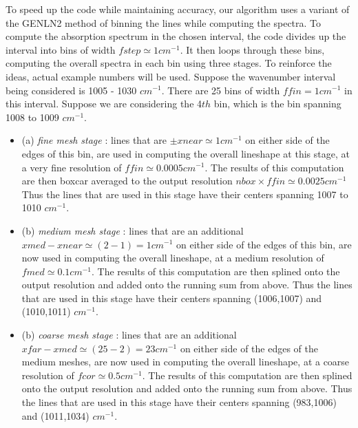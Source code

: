 \documentclass[11pt]{article}
\begin{document}
To speed up the code while maintaining accuracy, our algorithm uses a variant 
of the GENLN2 method of binning the lines while computing the spectra. To 
compute the absorption 
spectrum in the chosen interval, the code divides up the interval into 
bins of width $fstep \simeq 1 cm^{-1}$.  It then loops through these bins, 
computing the overall spectra in each bin using three stages. To reinforce
the ideas, actual example numbers will be used. Suppose the wavenumber
interval being considered is 1005 - 1030 $cm^{-1}$. There are 25 bins of
width $ffin = 1 cm^{-1}$ in this interval. Suppose we are considering the
4$th$ bin, which is the bin spanning 1008 to 1009 $cm^{-1}$.
\begin{itemize}
\item (a) {\it fine mesh stage} : lines that are $\pm xnear \simeq 1cm^{-1}$
          on either side of the edges of this bin, are used in computing 
          the overall lineshape at this stage, at a very fine resolution of 
          $ffin \simeq 0.0005 cm^{-1}$. The results of this computation 
          are then boxcar averaged to the output resolution $nbox \times 
          ffin \simeq 0.0025 cm^{-1}$ \\
          Thus the lines that are used in this stage have their centers 
          spanning 1007 to 1010 $cm^{-1}$.

\item (b) {\it medium mesh stage} : lines that are an additional 
          $xmed - xnear \simeq (2 - 1) = 1 cm^{-1}$ on either side of the 
          edges of this bin, are now used in computing 
          the overall lineshape, at a medium resolution of 
          $fmed \simeq 0.1 cm^{-1}$. The results of this computation 
          are then splined onto the output resolution and added onto the
          running sum from above.
          Thus the lines that are used in this stage have their centers 
          spanning (1006,1007) and (1010,1011) $cm^{-1}$.

\item (b) {\it coarse mesh stage} : lines that are an additional 
          $xfar - xmed \simeq (25 - 2) = 23 cm^{-1}$ on either side of the 
          edges of the medium meshes, are now used in computing 
          the overall lineshape, at a coarse resolution of 
          $fcor \simeq 0.5 cm^{-1}$. The results of this computation 
          are then splined onto the output resolution and added onto the
          running sum from above.
          Thus the lines that are used in this stage have their centers 
          spanning (983,1006) and (1011,1034) $cm^{-1}$.
\end{itemize}
\end{document}
